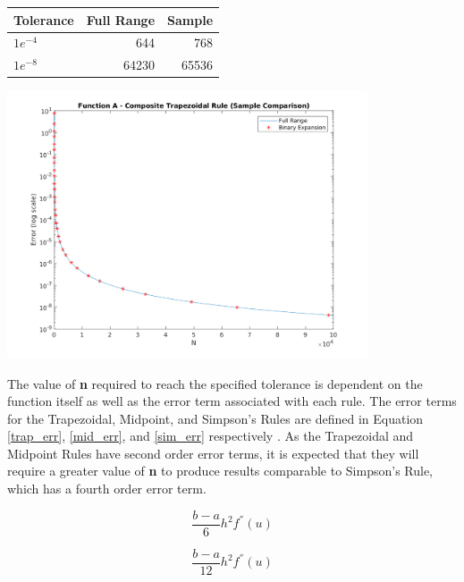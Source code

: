\documentclass[a4paper]{article}
\begin{document}
\bgroup
\def\arraystretch{1.5}
\begin{center}
	\centering
	\begin{tabular}{l|r|r}
	\textbf{Tolerance} & \textbf{Full Range} & \textbf{Sample} \\
	\hline
	$1e^{-4}$ & 644 & 768\\
	$1e^{-8}$ & 64230 & 65536
	\end{tabular}
	\label{table:sample_comparison}
\end{center}
\egroup

\begin{center}
	\includegraphics[width=0.8\textwidth]{../output/a_trapezoidal_sample_comparison.png}
	\label{fig:sample_comparison}
\end{center}

The value of \textbf{n} required to reach the specified tolerance is dependent on the function itself as well as the error term associated with each rule. The error terms for the Trapezoidal, Midpoint, and Simpson's Rules are defined in Equation \ref{trap_err}, \ref{mid_err}, and \ref{sim_err} respectively \citep{burden2010}. As the Trapezoidal and Midpoint Rules have second order error terms, it is expected that they will require a greater value of \textbf{n} to produce results comparable to Simpson's Rule, which has a fourth order error term.

\begin{equation}
\frac{b-a}{6}h^2f^{''}(u)
\label{trap_err}
\end{equation}

\begin{equation}
\frac{b-a}{12}h^2f^{''}(u)
\label{mid_err}
\end{equation}
\end{document}
